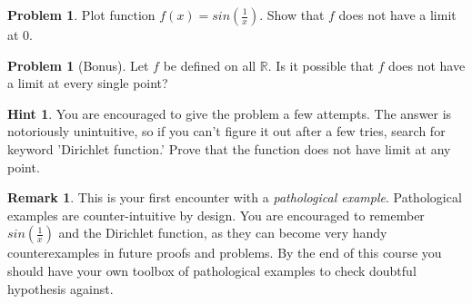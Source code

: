 \documentclass[letterpaper, 12pt]{article}
\theoremstyle{plain}
\theoremstyle{definition}
\newtheorem{problem}[theorem]{Problem}
\newtheorem*{remark}{Remark}
\newtheorem*{hint}{Hint}
\begin{document}
\begin{problem}
    Plot function $f(x) = sin(\frac{1}{x})$. Show that $f$ does not have a limit at 0.
\end{problem}

\begin{problem}[Bonus]
    Let $f$ be defined on all $\mathbb{R}$. Is it possible that $f$ does not have a limit at every single point?
\end{problem}
\begin{hint}
    You are encouraged to give the problem a few attempts. The answer is notoriously unintuitive, so if you can't figure it out after a few tries, search for keyword 'Dirichlet function.' Prove that the function does not have limit at any point.
\end{hint}
\begin{remark}
    This is your first encounter with a {\it pathological example}. Pathological examples are counter-intuitive by design. You are encouraged to remember $sin(\frac{1}{x})$ and the Dirichlet function, as they can become very handy counterexamples in future proofs and problems. By the end of this course you should have your own toolbox of pathological examples to check doubtful hypothesis against.
\end{remark}
\end{document}
